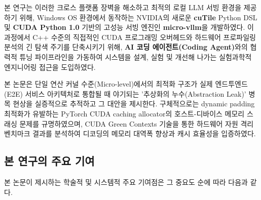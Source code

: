 \documentclass[preprint]{kcc} %
\begin{document}
본 연구는 이러한 크로스 플랫폼 장벽을 해소하고 최적의 로컬 LLM 서빙 환경을 제공하기 위해, Windows OS 환경에서 동작하는 NVIDIA의 새로운 \textbf{cuTile} Python DSL 및 \textbf{CUDA Python 1.0} 기반의 고성능 서빙 엔진인 \textbf{micro-vllm}을 개발하였다. 이 과정에서 C++ 수준의 직접적인 CUDA 프로그래밍 오버헤드와 하드웨어 프로파일링 분석의 긴 탐색 주기를 단축시키기 위해, \textbf{AI 코딩 에이전트(Coding Agent)}와의 협력적 튜닝 파이프라인을 가동하여 시스템을 설계, 실험 및 개선해 나가는 실험과학적 엔지니어링 접근을 도입하였다.

본 논문은 단일 연산 커널 수준(Micro-level)에서의 최적화 구조가 실제 엔드투엔드(E2E) 서비스 아키텍처로 통합될 때 야기되는 '추상화의 누수(Abstraction Leak)' 병목 현상을 실증적으로 추적하고 그 대안을 제시한다. 구체적으로는 dynamic padding 최적화가 유발하는 PyTorch CUDA caching allocator의 호스트-디바이스 메모리 스래싱 문제를 규명하였으며, CUDA Green Contexts 기술을 통한 하드웨어 자원 격리 벤치마크 결과를 분석하여 디코딩의 메모리 대역폭 향상과 캐시 효율성을 입증하였다.

\subsection{본 연구의 주요 기여}
본 논문이 제시하는 학술적 및 시스템적 주요 기여점은 그 중요도 순에 따라 다음과 같다.
\end{document}
